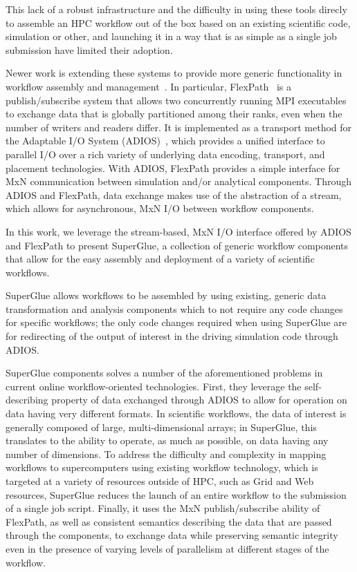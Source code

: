 \documentclass[conference]{IEEEtran}
\begin{document}
This lack of a robust infrastructure and the difficulty in
using these tools direcly to assemble an
HPC workflow out of the box
based on an existing scientific code,
simulation or other,
and launching it in a way that is
as simple as a single job submission
have limited their adoption.

Newer work is extending these
systems to provide more generic functionality
in workflow assembly and
management~\cite{dayal:2014:flexpath,dayal:2015:escience,lofstead:2012:txn,lofstead:2013:txn-pdsw,lofstead:2012:txn-metadata,lofstead:2014:txn,lofstead:2016:superglue}.
In particular, FlexPath~\cite{dayal:2014:flexpath}
is a publish/subscribe system that allows
two concurrently running MPI executables to
exchange data that is globally partitioned among
their ranks, even when the number of writers and readers differ.
It is implemented as a transport method for the
Adaptable I/O System (ADIOS)~\cite{lofstead:2009:adaptable},
which provides a unified interface to parallel I/O over a rich
variety of underlying data encoding, transport, and placement technologies.
With ADIOS, FlexPath provides a simple interface for MxN communication
between simulation and/or analytical components.
Through ADIOS and FlexPath, data exchange makes use
of the abstraction of a stream, which allows
for asynchronous, MxN I/O between workflow components.

In this work, we leverage the stream-based, MxN
I/O interface offered by ADIOS and FlexPath
to present SuperGlue, a collection of generic workflow components
that allow for the easy assembly and deployment
of a variety of scientific workflows.

SuperGlue allows workflows to be assembled
by using existing, generic
data transformation and 
analysis components
which to not require any code changes
for specific workflows;
the only code changes required when
using SuperGlue are 
for redirecting of the output of interest
in the driving simulation code through ADIOS.

SuperGlue components solves a number of the aforementioned problems in
current online workflow-oriented technologies.
First, they leverage the self-describing
property of data exchanged through ADIOS to
allow for operation on data having very different formats.
In scientific workflows, the data of interest
is generally composed of large, multi-dimensional
arrays; in SuperGlue, this translates to
the ability to operate, as much as possible,
on data having any number of dimensions.
To address the difficulty and complexity
in mapping workflows to supercomputers using
existing workflow technology, which is targeted
at a variety of resources outside of HPC, such as Grid and Web
resources,
SuperGlue reduces the
launch of an entire workflow to the submission of a single job script.
Finally, it uses the MxN publish/subscribe
ability of FlexPath,
as well as consistent semantics describing
the data that are passed through the components,
to exchange data while preserving semantic integrity
even in the presence of varying levels of parallelism 
at different stages of the workflow.
\end{document}
